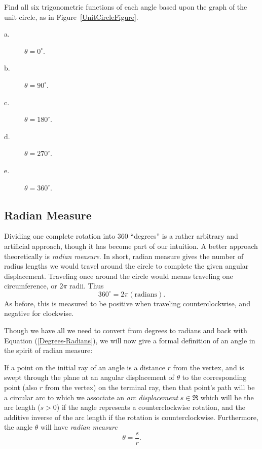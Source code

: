 \bhw Find all six trigonometric functions of each angle
based upon the graph of the unit circle, as in 
Figure~\ref{UnitCircleFigure}.
\begin{description}
\item[a.] $\theta=0^\circ$.
\item[b.] $\theta=90^\circ$.
\item[c.] $\theta=180^\circ$.
\item[d.] $\theta=270^\circ$.
\item[e.] $\theta=360^\circ$.
\end{description}
\ehw

\subsection{Radian Measure}
Dividing one complete rotation into 360 ``degrees'' is a rather 
arbitrary and artificial approach, though it has become part
of our intuition.  A better approach theoretically is 
{\it radian measure}.  In short, radian measure gives the
number of radius lengths we would travel around the circle
to complete the given angular displacement.  Traveling
once around the circle would means traveling one
circumference, or $2\pi$ radii.  
Thus 
\begin{equation}360^\circ=2\pi(\text{radians}).
\label{Degrees-Radians}\end{equation}
As before, this is measured to be positive when traveling
counterclockwise, and negative for clockwise.

Though we have all we need to convert from degrees
to radians and back with Equation (\ref{Degrees-Radians}),
we will now give a formal definition of an angle 
in the spirit of radian measure:

\begin{definition}
If a point on the initial ray of an angle is a distance
$r$ from the vertex, and is swept through the plane at
an angular displacement of $\theta$ to the corresponding
point (also $r$ from the vertex) on the terminal ray,
then that point's path will be a circular arc to
which we associate an {\it arc displacement} $s\in\Re$
which will be the arc length ($s>0$) if the angle
represents a counterclockwise rotation, and the
additive inverse of the arc length if the 
rotation is counterclockwise.  Furthermore,
the angle $\theta$ will have {\it radian measure}
\begin{equation}\theta=\frac{s}r.
\label{Theta=S/R}\end{equation}
\end{definition}

